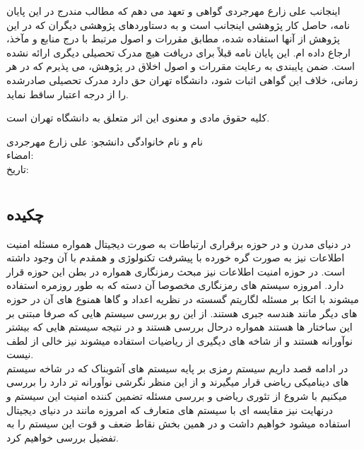 \documentclass[12pt]{report}
\begin{document}
\vspace*{1.2cm}

\noindent
اینجانب
علی زارع مهرجردی
گواهی و تعهد می دهم که مطالب مندرج در این 
پایان نامه، 
حاصل کار پژوهشی اینجانب است و به دستاوردهای پژوهشی دیگران که در این پژوهش از آنها استفاده شده،
مطابق مقررات و اصول مرتبط با درج منابع و مآخذ، ارجاع داده ام.
این 
پایان نامه
قبلاً برای دریافت هیچ مدرک تحصیلی دیگری ارائه نشده است.
ضمن پایبندی به رعایت مقررات و اصول اخلاق در پژوهش، می پذیرم که در هر زمانی، خلاف این گواهی اثبات شود،
دانشگاه تهران حق دارد مدرک تحصیلی صادرشده را از درجه اعتبار ساقط نماید.

\vspace*{0.8cm}

\noindent
کلیه حقوق مادی و معنوی این اثر متعلق به دانشگاه تهران است.

\vspace*{2.5cm}

\begin{flushleft}
    \begin{minipage}{0.45\textwidth}
        نام و نام خانوادگی دانشجو: علی زارع مهرجردی \\[0.8cm]
        امضاء: \\[0.8cm]
        تاریخ:
    \end{minipage}
\end{flushleft}


\chapter*{}
\section*{چکیده}
\thispagestyle{empty}
در دنیای مدرن و در حوزه برقراری ارتباطات به صورت دیجیتال همواره مسئله
امنیت اطلاعات
نیز به صورت گره خورده با پیشرفت
تکنولوژی و همقدم با آن وجود داشته است. در حوزه امنیت اطلاعات نیز مبحث رمزنگاری همواره در بطن این حوزه قرار دارد.
امروزه سیستم های رمزنگاری مخصوصا آن دسته که به طور روزمره استفاده میشوند با اتکا بر مسئله
لگاریتم گسسته
در
نظریه اعداد
و گاها همنوع های آن در حوزه
های دیگر مانند
هندسه جبری
هستند.
از این رو بررسی سیستم هایی که صرفا مبتنی بر این ساختار ها هستند همواره درحال بررسی هستند و در نتیجه سیستم هایی که بیشتر نوآورانه هستند
و از شاخه های دیگیری از ریاضیات استفاده میشوند نیز خالی از لطف نیست.
\\
در ادامه قصد داریم سیستم رمزی بر پایه
سیستم های آشوبناک
که در شاخه
سیستم های دینامیکی
ریاضی قرار میگیرند و از این منظر
نگرشی نوآورانه تر دارد را بررسی میکنیم با شروع از تئوری ریاضی و بررسی مسئله تضمین کننده امنیت این سیستم و درنهایت نیز مقایسه ای با 
سیستم های متعارف که امروزه مانند
در دنیای دیجیتال استفاده میشود خواهیم داشت و در همین بخش نقاط ضعف و قوت این سیستم را به تفضیل بررسی خواهیم کرد.
\end{document}
